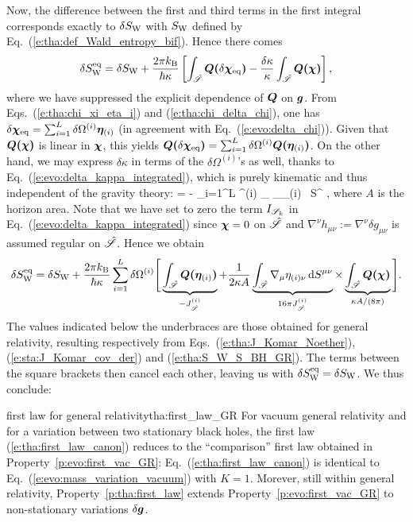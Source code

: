 Now, the difference between the first and third terms in the first integral
corresponds exactly to $\delta S_{\rm W}$ with $S_{\rm W}$ defined
by Eq.~(\ref{e:tha:def_Wald_entropy_bif}). Hence there comes
\[
     \delta S_{\rm W}^{\rm eq} =  \delta S_{\rm W}
     + \frac{2 \pi k_{\rm B}}{\hbar\kappa} \left[
     \int_{\hat{\mathscr{S}}} \bm{Q}\textbf{(}\delta\bm{\chi}_{\rm eq}\textbf{)}
     - \frac{\delta\kappa}{\kappa}  \int_{\hat{\mathscr{S}}} \bm{Q}\textbf{(}\bm{\chi}\textbf{)}
     \right] ,
\]
where we have suppressed the  explicit dependence of $\bm{Q}$ on $\bm{g}$.
From Eqs.~(\ref{e:tha:chi_xi_eta_i}) and (\ref{e:tha:chi_delta_chi}), one
has $\delta\bm{\chi}_{\rm eq} =  \sum_{i=1}^{L} \delta\Omega^{(i)} \bm{\eta}_{(i)}$
(in agreement with Eq.~(\ref{e:evo:delta_chi})).
Given that $\bm{Q}\textbf{(}\bm{\chi}\textbf{)}$ is linear in $\bm{\chi}$, this
yields $\bm{Q}\textbf{(}\delta\bm{\chi}_{\rm eq}\textbf{)} =  \sum_{i=1}^{L} \delta\Omega^{(i)} \bm{Q}\textbf{(}\bm{\eta}_{(i)}\textbf{)}$.
On the other hand, we may express $\delta\kappa$ in terms of the $\delta\Omega^{(i)}$'s as well,
thanks to Eq.~(\ref{e:evo:delta_kappa_integrated}), which is purely kinematic and thus
independent of the gravity theory:
\be
    \delta\kappa = - \sum_{i=1}^L  \delta\Omega^{(i)}
    \int_{\hat{\Sp}} \nabla_\mu \eta_{(i)\nu} \, \D S^{\mu\nu} ,
\ee
where $A$ is the horizon area. Note that we have set to zero the term $I_{\mathscr{S}_k}$
in Eq.~(\ref{e:evo:delta_kappa_integrated}) since $\bm{\chi} = 0$ on $\hat{\mathscr{S}}$
and $\nabla^\nu h_{\mu\nu} := \nabla^\nu \delta g_{\mu\nu}$ is assumed
regular on $\hat{\mathscr{S}}$.  Hence we obtain
\[
    \delta S_{\rm W}^{\rm eq} =  \delta S_{\rm W}
     + \frac{2 \pi k_{\rm B}}{\hbar\kappa}
     \sum_{i=1}^L  \delta\Omega^{(i)}\Bigg[
     \underbrace{\int_{\hat{\mathscr{S}}}  \bm{Q}\textbf{(}\bm{\eta}_{(i)}\textbf{)}}_{-J^{(i)}_{\hat{\mathscr{S}}}}
     + \frac{1}{2\kappa A}
     \underbrace{\int_{\hat{\mathscr{S}}} \nabla_\mu \eta_{(i)\nu} \, \mathrm{d} S^{\mu\nu}}_{16\pi J^{(i)}_{\hat{\mathscr{S}}}}
     \times
     \underbrace{\int_{\hat{\mathscr{S}}} \bm{Q}\textbf{(}\bm{\chi}\textbf{)}}_{\kappa A/(8\pi)}
     \Bigg] .
\]
The values indicated below the underbraces are those obtained for general relativity,
resulting respectively from Eqs.~(\ref{e:tha:J_Komar_Noether}),
(\ref{e:sta:J_Komar_cov_der}) and (\ref{e:tha:S_W_S_BH_GR}).
The terms between the square brackets then cancel each other, leaving us
with $\delta S_{\rm W}^{\rm eq} =  \delta S_{\rm W}$.
We thus conclude:

\begin{tprop}{first law for general relativity}{tha:first_law_GR}
For vacuum general relativity and for a variation between two stationary black holes,
the first law (\ref{e:tha:first_law_canon}) reduces
to the ``comparison'' first law obtained in Property~\ref{p:evo:first_vac_GR}:
Eq.~(\ref{e:tha:first_law_canon}) is identical to
Eq.~(\ref{e:evo:mass_variation_vacuum}) with $K=1$.
Morever, still within general relativity, Property~\ref{p:tha:first_law} extends
Property~\ref{p:evo:first_vac_GR} to non-stationary variations
$\delta\bm{g}$.
\end{tprop}


